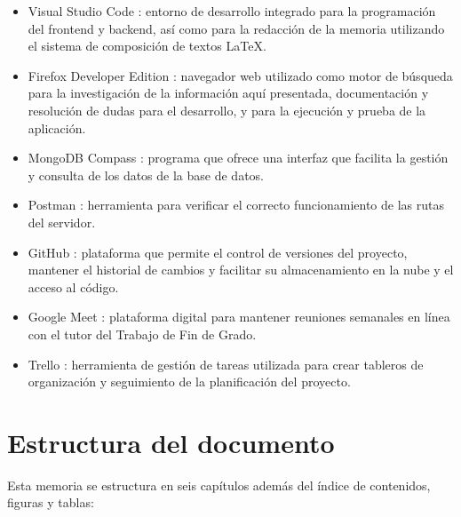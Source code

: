 \begin{itemize}
    \item Visual Studio Code \cite{vscode}: entorno de desarrollo integrado para la programación del frontend y backend, así como para la redacción de la memoria utilizando el sistema de composición de textos LaTeX.
    \item Firefox Developer Edition \cite{firefox}: navegador web utilizado como motor de búsqueda para la investigación de la información aquí presentada, documentación y resolución de dudas para el desarrollo, y para la ejecución y prueba de la aplicación.
    \item MongoDB Compass \cite{mongodb_compass}: programa que ofrece una interfaz que facilita la gestión y consulta de los datos de la base de datos.
    \item Postman \cite{postman}: herramienta para verificar el correcto funcionamiento de las rutas del servidor.
    \item GitHub \cite{github}: plataforma que permite el control de versiones del proyecto, mantener el historial de cambios y facilitar su almacenamiento en la nube y el acceso al código.
    \item Google Meet \cite{google_meet}: plataforma digital para mantener reuniones semanales en línea con el tutor del Trabajo de Fin de Grado.
    \item Trello \cite{trello}: herramienta de gestión de tareas utilizada para crear tableros de organización y seguimiento de la planificación del proyecto.
\end{itemize}


\section{Estructura del documento}

Esta memoria se estructura en seis capítulos además del índice de contenidos, figuras y tablas:

